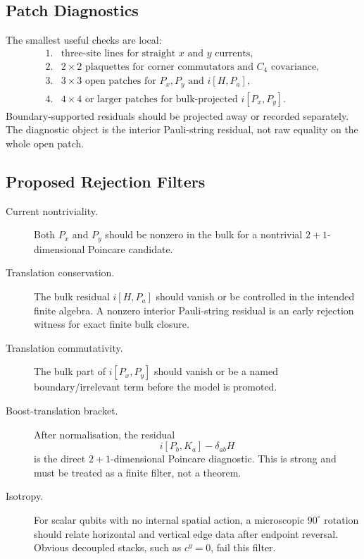 \subsection{Patch Diagnostics}

The smallest useful checks are local:
\[
\begin{array}{ll}
1.&\text{three-site lines for straight }x\text{ and }y\text{ currents},\\
2.&2\times2\text{ plaquettes for corner commutators and }C_4\text{ covariance},\\
3.&3\times3\text{ open patches for }P_x,P_y\text{ and }i[H,P_a],\\
4.&4\times4\text{ or larger patches for bulk-projected }i[P_x,P_y].
\end{array}
\]
Boundary-supported residuals should be projected away or recorded separately.
The diagnostic object is the interior Pauli-string residual, not raw equality
on the whole open patch.

\subsection{Proposed Rejection Filters}

\begin{description}
\item[Current nontriviality.]
Both \(P_x\) and \(P_y\) should be nonzero in the bulk for a nontrivial
\(2+1\)-dimensional Poincare candidate.

\item[Translation conservation.]
The bulk residual \(i[H,P_a]\) should vanish or be controlled in the intended
finite algebra.  A nonzero interior Pauli-string residual is an early rejection
witness for exact finite bulk closure.

\item[Translation commutativity.]
The bulk part of \(i[P_x,P_y]\) should vanish or be a named boundary/irrelevant
term before the model is promoted.

\item[Boost-translation bracket.]
After normalisation, the residual
\[
  i[P_b,K_a]-\delta_{ab}H
\]
is the direct \(2+1\)-dimensional Poincare diagnostic.  This is strong and must
be treated as a finite filter, not a theorem.

\item[Isotropy.]
For scalar qubits with no internal spatial action, a microscopic \(90^\circ\)
rotation should relate horizontal and vertical edge data after endpoint
reversal.  Obvious decoupled stacks, such as \(c^y=0\), fail this filter.
\end{description}

